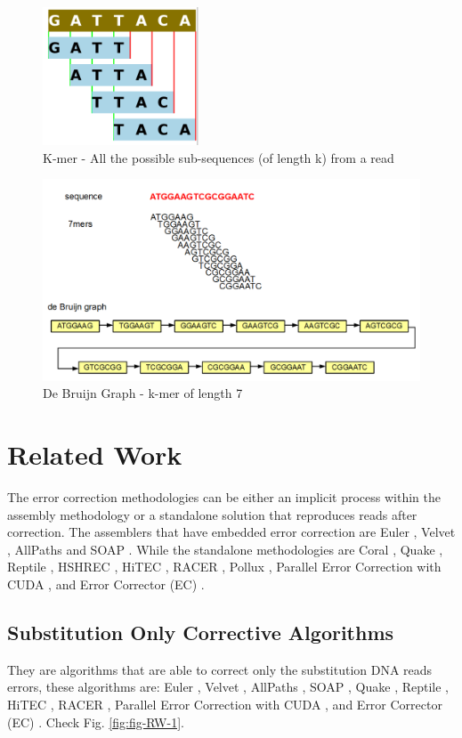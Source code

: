 \documentclass[12pt]{llncs}
\begin{document}
\newpage
\begin{figure}
	\centering
	\includegraphics[width=.3\linewidth]{./figs/CrrConcepts-1}
	\caption{\label{fig:fig-CrrConcepts-1}{K-mer} - All the possible sub-sequences (of length k) from a read}
\end{figure}
\vspace{2cm}
\begin{figure}
	\centering
	\includegraphics[width=.8\linewidth]{./figs/CrrConcepts-2}
	\caption{\label{fig:fig-CrrConcepts-2}{De Bruijn Graph} - k-mer of length 7}
\end{figure}
%
\newpage
\chapter{\label{chap:3}Related Work}
The error correction methodologies can be either an implicit process within the assembly methodology or a standalone solution that reproduces reads after correction. The assemblers that have embedded error correction are Euler \cite{Euler}, Velvet \cite{Velvet}, AllPaths \cite{AllPaths} and SOAP \cite{Soap}. While the standalone methodologies are Coral \cite{Coral}, Quake \cite{Quake}, Reptile \cite{Reptile}, HSHREC \cite{HShrec}, HiTEC \cite{HiTec}, RACER \cite{Racer}, Pollux \cite{Pollux}, Parallel Error Correction with CUDA \cite{Cuda}, and Error Corrector (EC) \cite{EC}.
\section{Substitution Only Corrective Algorithms}
They are algorithms that are able to correct only the substitution DNA reads errors, these algorithms are: Euler \cite{Euler}, Velvet \cite{Velvet}, AllPaths \cite{AllPaths}, SOAP \cite{Soap}, Quake \cite{Quake}, Reptile \cite{Reptile}, HiTEC \cite{HiTec}, RACER \cite{Racer}, Parallel Error Correction with CUDA \cite{Cuda}, and Error Corrector (EC) \cite{EC}. Check Fig. \ref{fig:fig-RW-1}.
\end{document}
